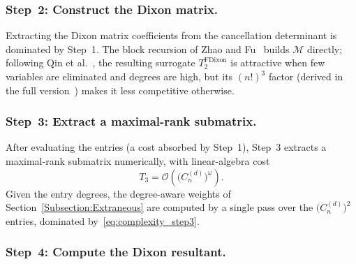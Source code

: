 \subsubsection{Step~2: Construct the Dixon matrix.}
Extracting the Dixon matrix coefficients from the cancellation determinant is dominated by Step~1. The block recursion of Zhao and Fu~\cite{Zhao2005extfast} builds $\mathcal{M}$ directly; following Qin et al.~\cite{DBLP:journals/ijcm/QinWTJ17}, the resulting surrogate $T_{2}^{\mathrm{FDixon}}$ is attractive when few variables are eliminated and degrees are high, but its $(n!)^3$ factor (derived in the full version~\cite{cryptoeprint:2026/1969}) makes it less competitive otherwise.

\subsubsection{Step~3: Extract a maximal-rank submatrix.}
After evaluating the entries (a cost absorbed by Step~1), Step~3 extracts a maximal-rank submatrix numerically, with linear-algebra cost
\begin{equation}
	T_3 = \mathcal{O}\!\left(\bigl(C_n^{(d)}\bigr)^{\omega}\right).
	\label{eq:complexity_step3}
\end{equation}
Given the entry degrees, the degree-aware weights of Section~\ref{Subsection:Extraneous} are computed by a single pass over the $\bigl(C_n^{(d)}\bigr)^2$ entries, dominated by~\eqref{eq:complexity_step3}.

\subsubsection{Step~4: Compute the Dixon resultant.}

